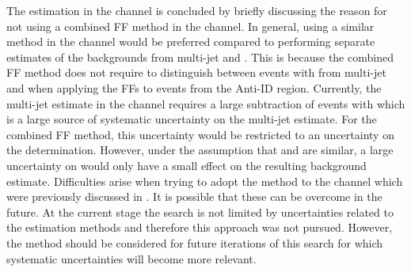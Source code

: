 The \faketauhadvis estimation in the \lephad channel is concluded by briefly
discussing the reason for not using a combined FF method in the \hadhad
channel. In general, using a similar method in the \hadhad channel would be
preferred compared to performing separate estimates of the \faketauhadvis
backgrounds from multi-jet and \ttbar.  This is because the combined FF method
does not require to distinguish between events with \faketauhadvis from
multi-jet and \ttbar when applying the FFs to events from the Anti-ID
region. Currently, the multi-jet estimate in the \hadhad channel requires a
large subtraction of \ttbar events with \faketauhadvis which is a large source
of systematic uncertainty on the multi-jet estimate. For the combined FF method,
this uncertainty would be restricted to an uncertainty on the \rqcd
determination. However, under the assumption that \FFqcd and \FFttbar are
similar, a large uncertainty on \rqcd would only have a small effect on the
resulting \faketauhadvis background estimate. Difficulties arise when trying to
adopt the method to the \hadhad channel which were previously discussed in
. It is possible that these can be overcome in
the future. At the current stage the search is not limited by uncertainties
related to the \faketauhadvis estimation methods and therefore this approach was
not pursued. However, the method should be considered for future iterations of
this search for which systematic uncertainties will become more relevant.

